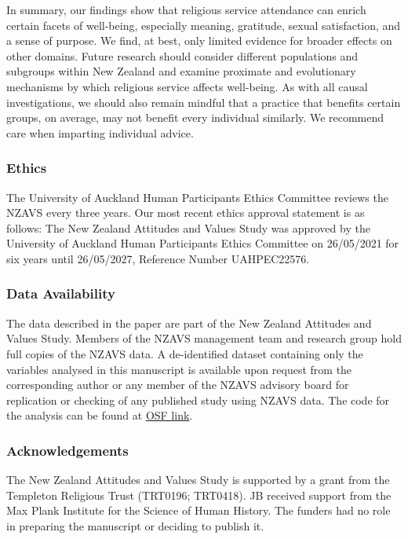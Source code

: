 \documentclass[
  single column]{article}
\begin{document}
In summary, our findings show that religious service attendance can
enrich certain facets of well-being, especially meaning, gratitude,
sexual satisfaction, and a sense of purpose. We find, at best, only
limited evidence for broader effects on other domains. Future research
should consider different populations and subgroups within New Zealand
and examine proximate and evolutionary mechanisms by which religious
service affects well-being. As with all causal investigations, we should
also remain mindful that a practice that benefits certain groups, on
average, may not benefit every individual similarly. We recommend care
when imparting individual advice.

\subsubsection{Ethics}\label{ethics}

The University of Auckland Human Participants Ethics Committee reviews
the NZAVS every three years. Our most recent ethics approval statement
is as follows: The New Zealand Attitudes and Values Study was approved
by the University of Auckland Human Participants Ethics Committee on
26/05/2021 for six years until 26/05/2027, Reference Number UAHPEC22576.

\subsubsection{Data Availability}\label{data-availability}

The data described in the paper are part of the New Zealand Attitudes
and Values Study. Members of the NZAVS management team and research
group hold full copies of the NZAVS data. A de-identified dataset
containing only the variables analysed in this manuscript is available
upon request from the corresponding author or any member of the NZAVS
advisory board for replication or checking of any published study using
NZAVS data. The code for the analysis can be found at
\href{https://osf.io/wgtz4/}{OSF link}.

\subsubsection{Acknowledgements}\label{acknowledgements}

The New Zealand Attitudes and Values Study is supported by a grant from
the Templeton Religious Trust (TRT0196; TRT0418). JB received support
from the Max Plank Institute for the Science of Human History. The
funders had no role in preparing the manuscript or deciding to publish
it.
\end{document}
